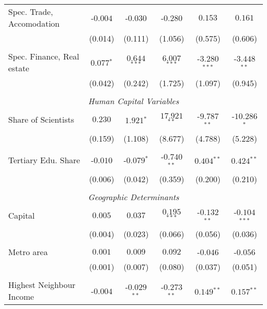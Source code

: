 \documentclass[11pt]{article}
\begin{document}
\begin{table}[!htbp]
{\begin{minipage}{\textwidth}
\begin{tabular}{@{\extracolsep{5pt}} lccccc}
Spec. Trade, Accomodation & $ $-$0.004$ & $ $-$0.030$ & $ $-$0.280$ & $0.153$ & $0.161$ \\ 
& (0.014) &  (0.111) & (1.056) & (0.575) & (0.606)\\
&\\
Spec. Finance, Real estate & $0.077$$^{*}$ & $0.644$$^{***}$ & $6.007$$^{***}$ & $ $-$3.280$$^{***}$ & $ $-$3.448$$^{**}$ \\ 
& (0.042) &  (0.242) & (1.725) & (1.097) & (0.945)\\
&\\
\multicolumn{6}{c}{\textit{Human Capital Variables}}\\
Share of Scientists & $0.230$ & $1.921$$^{*}$ & $17.921$$^{**}$ & $ $-$9.787$$^{**}$ & $ $-$10.286$$^{*}$ \\
& (0.159) &  (1.108) & (8.677) & (4.788) & (5.228)\\
&\\
Tertiary Edu. Share & $ $-$0.010$ & $ $-$0.079$$^{*}$ & $ $-$0.740$$^{**}$ & $0.404$$^{**}$ & $0.424$$^{**}$ \\
& (0.006) &  (0.042) & (0.359) & (0.200) & (0.210)\\
&\\
\multicolumn{6}{c}{\textit{Geographic Determinants}}\\
Capital & $0.005$ & $0.037$ & $0.195$$^{***}$ & $ $-$0.132$$^{**}$ & $ $-$0.104$$^{***}$ \\
& (0.004) &  (0.023) & (0.066) & (0.056) & (0.036)\\
&\\
Metro area & $0.001$ & $0.009$ & $0.092$ & $ $-$0.046$ & $ $-$0.056$ \\
& (0.001) &  (0.007) & (0.080) & (0.037) & (0.051)\\
&\\
Highest Neighbour Income & $ $-$0.004$ & $ $-$0.029$$^{**}$ & $ $-$0.273$$^{**}$ & $ 0.149$$^{**}$ & $ 0.157$$^{**}$ \\ 

\end{tabular}
\end{minipage}}
\end{table}
\end{document}
